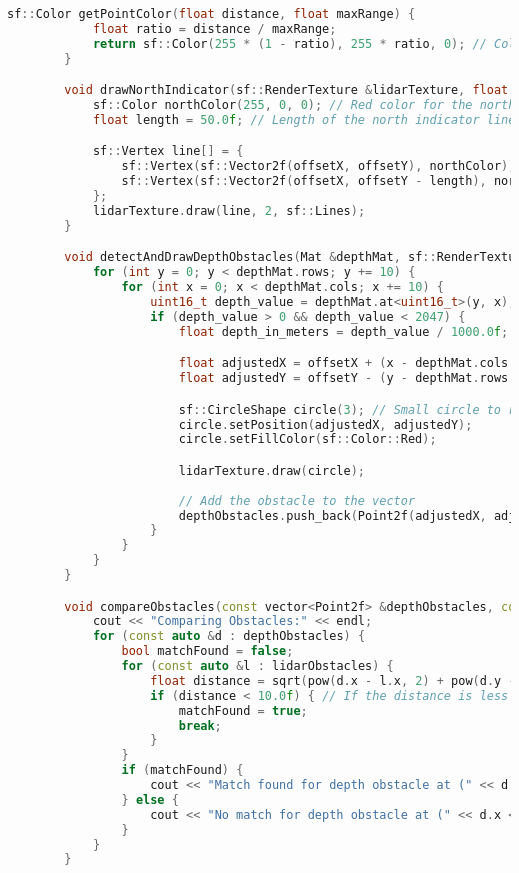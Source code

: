 \begin{lstlisting}[language={C++}, caption={C\'odigo de ejemplo de Kinect y LiDAR}, label={fresd}]
        sf::Color getPointColor(float distance, float maxRange) {
            float ratio = distance / maxRange;
            return sf::Color(255 * (1 - ratio), 255 * ratio, 0); // Color from red to green
        }

        void drawNorthIndicator(sf::RenderTexture &lidarTexture, float offsetX, float offsetY) {
            sf::Color northColor(255, 0, 0); // Red color for the north indicator
            float length = 50.0f; // Length of the north indicator line

            sf::Vertex line[] = {
                sf::Vertex(sf::Vector2f(offsetX, offsetY), northColor),
                sf::Vertex(sf::Vector2f(offsetX, offsetY - length), northColor) // Line pointing upwards
            };
            lidarTexture.draw(line, 2, sf::Lines);
        }

        void detectAndDrawDepthObstacles(Mat &depthMat, sf::RenderTexture &lidarTexture, float offsetX, float offsetY, float scale, vector<Point2f> &depthObstacles) {
            for (int y = 0; y < depthMat.rows; y += 10) {
                for (int x = 0; x < depthMat.cols; x += 10) {
                    uint16_t depth_value = depthMat.at<uint16_t>(y, x);
                    if (depth_value > 0 && depth_value < 2047) {
                        float depth_in_meters = depth_value / 1000.0f;

                        float adjustedX = offsetX + (x - depthMat.cols / 2) * scale / depth_in_meters;
                        float adjustedY = offsetY - (y - depthMat.rows / 2) * scale / depth_in_meters; // Invert Y to match screen coordinates

                        sf::CircleShape circle(3); // Small circle to represent the obstacle
                        circle.setPosition(adjustedX, adjustedY);
                        circle.setFillColor(sf::Color::Red);

                        lidarTexture.draw(circle);
                        
                        // Add the obstacle to the vector
                        depthObstacles.push_back(Point2f(adjustedX, adjustedY));
                    }
                }
            }
        }

        void compareObstacles(const vector<Point2f> &depthObstacles, const vector<Point2f> &lidarObstacles) {
            cout << "Comparing Obstacles:" << endl;
            for (const auto &d : depthObstacles) {
                bool matchFound = false;
                for (const auto &l : lidarObstacles) {
                    float distance = sqrt(pow(d.x - l.x, 2) + pow(d.y - l.y, 2));
                    if (distance < 10.0f) { // If the distance is less than a threshold, consider it a match
                        matchFound = true;
                        break;
                    }
                }
                if (matchFound) {
                    cout << "Match found for depth obstacle at (" << d.x << ", " << d.y << ")" << endl;
                } else {
                    cout << "No match for depth obstacle at (" << d.x << ", " << d.y << ")" << endl;
                }
            }
        }


\end{lstlisting}

